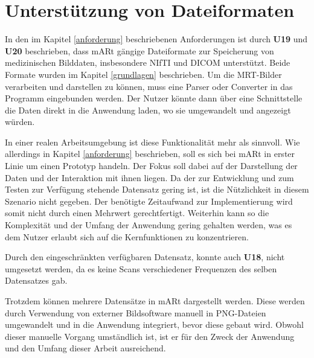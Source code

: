 

\section{Unterstützung von Dateiformaten} 

In den im Kapitel \ref{anforderung} beschriebenen Anforderungen ist durch \textbf{U19} und \textbf{U20} beschrieben, dass mARt gängige Dateiformate zur Speicherung von medizinischen Bilddaten, insbesondere NIfTI und DICOM unterstützt. Beide Formate wurden im Kapitel \ref{grundlagen} beschrieben. 
Um die MRT-Bilder verarbeiten und darstellen zu können, muss eine Parser oder Converter in das Programm eingebunden werden. 
Der Nutzer könnte dann über eine Schnittstelle die Daten direkt in die Anwendung laden, wo sie umgewandelt und angezeigt würden. 

In einer realen Arbeitsumgebung ist diese Funktionalität mehr als sinnvoll. Wie allerdings in Kapitel \ref{anforderung} beschrieben, soll es sich bei mARt in erster Linie um einen Prototyp handeln.
Der Fokus soll dabei auf der Darstellung der Daten und der Interaktion mit ihnen liegen. Da der zur Entwicklung und zum Testen zur Verfügung stehende Datensatz gering ist, ist die Nützlichkeit in diesem Szenario nicht gegeben. Der benötigte Zeitaufwand zur Implementierung wird somit nicht durch einen Mehrwert gerechtfertigt.
Weiterhin kann so die Komplexität und der Umfang der Anwendung gering gehalten werden, was es dem Nutzer erlaubt sich auf die Kernfunktionen zu konzentrieren. 

Durch den eingeschränkten verfügbaren Datensatz, konnte auch \textbf{U18}, nicht umgesetzt werden, da es keine Scans verschiedener Frequenzen des selben Datensatzes gab.

Trotzdem können mehrere Datensätze in mARt dargestellt werden. Diese werden durch Verwendung von externer Bildsoftware manuell in PNG-Dateien umgewandelt und in die Anwendung integriert, bevor diese gebaut wird. 
Obwohl dieser manuelle Vorgang umständlich ist, ist er für den Zweck der Anwendung und den Umfang dieser Arbeit ausreichend.
